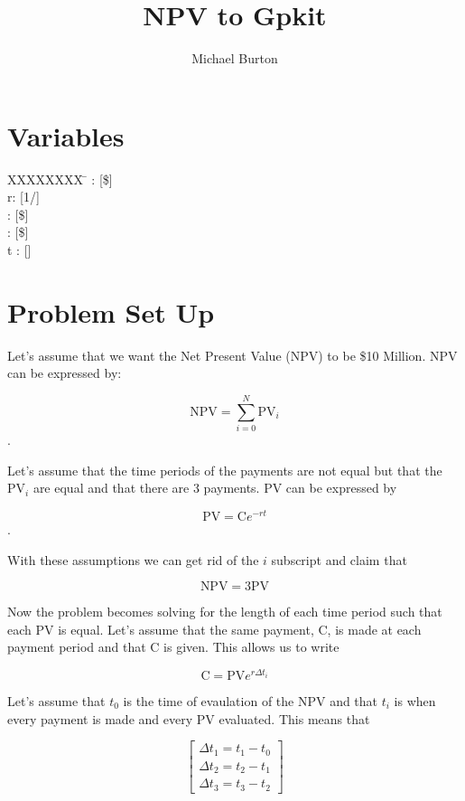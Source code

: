 \documentclass[10pt, a4paper]{article}
\begin{document}
\title{NPV to Gpkit}
\author{Michael Burton}
\maketitle

\section*{Variables}

\begin{tabbing}
  XXXXXXXX \= \kill%
 : [\$]  \\
r: [1/]   \\
: [\$]  \\
: [\$]  \\
t : [] 
\end{tabbing}

\section*{Problem Set Up}

Let's assume that we want the Net Present Value (NPV) to be \$10 Million.  NPV can be expressed by:

\[ \text{NPV} = \displaystyle\sum\limits_{i=0}^N \text{PV}_i \] .

Let's assume that the time periods of the payments are not equal but that the PV$_{i}$ are equal and that there are 3 payments.  PV can be expressed by

\[\text{PV} = \text{C} e^{-rt} \].

With these assumptions we can get rid of the $i$ subscript and claim that

\[\text{NPV} = 3\text{PV} \]

Now the problem becomes solving for the length of each time period such that each PV is equal.  Let's assume that the same payment, C, is made at each payment period and that C is given.  This allows us to write 

\[ \text{C}  = \text{PV}e^{r \Delta t_i} \]

Let's assume that $t_0$ is the time of evaulation of the NPV and that $t_i$ is when every payment is made and every PV evaluated. This means that

\[ \begin{bmatrix} \Delta t_1 = t_1 - t_0 \\
\Delta t_2 = t_2 - t_1 \\
\Delta t_3 = t_3 - t_2 
\end{bmatrix} \]
\end{document}
